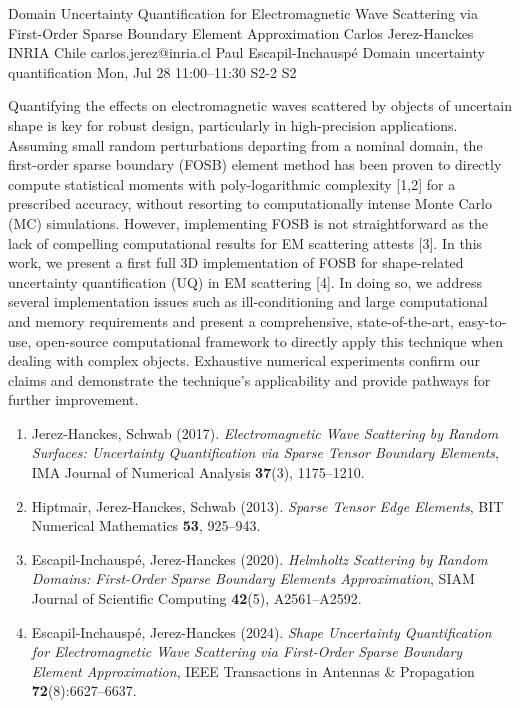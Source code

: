 \documentclass[12pt,lettersize,oneside]{book} %
\begin{document}
\begin{talk}
  {Domain Uncertainty Quantification for Electromagnetic Wave Scattering via First-Order Sparse Boundary Element Approximation}%
  {Carlos Jerez-Hanckes}%
  {INRIA Chile}%
  {carlos.jerez@inria.cl}%
  {Paul Escapil-Inchausp\'e}%
  {Domain uncertainty quantification}%
  {Mon, Jul 28 11:00--11:30}%
  {S2-2}%
  {S2}%
    
   
Quantifying the effects on electromagnetic waves scattered by objects of uncertain shape is key for robust design, particularly in high-precision applications. Assuming small random perturbations departing from a nominal domain, the first-order sparse boundary (FOSB) element method has been proven to directly compute statistical moments with poly-logarithmic complexity [1,2] for a prescribed accuracy, without resorting to computationally intense Monte Carlo (MC) simulations. However, implementing FOSB is not straightforward as the lack of compelling computational results for EM scattering attests [3]. In this work, we present a first full 3D implementation of FOSB for shape-related uncertainty quantification (UQ) in EM scattering [4]. In doing so, we address several implementation issues such as ill-conditioning and large computational and memory requirements and present a comprehensive, state-of-the-art, easy-to-use, open-source computational framework to directly apply this technique when dealing with complex objects. Exhaustive numerical experiments confirm our claims and demonstrate the technique's applicability and provide pathways for further improvement.

\medskip

\begin{enumerate}
 \item[{[1]}] Jerez-Hanckes, Schwab (2017). {\it Electromagnetic Wave Scattering by Random Surfaces: Uncertainty Quantification via Sparse Tensor Boundary Elements}, IMA Journal of Numerical Analysis {\bf 37}(3), 1175--1210.
 \item[{[2]}] Hiptmair, Jerez-Hanckes, Schwab (2013). {\it Sparse Tensor Edge Elements}, BIT Numerical Mathematics {\bf 53}, 925--943.
 \item[{[3]}] Escapil-Inchausp\'e, Jerez-Hanckes (2020). {\it Helmholtz Scattering by Random Domains: First-Order Sparse Boundary Elements Approximation}, SIAM Journal of Scientific Computing {\bf 42}(5), A2561--A2592.
 \item[{[4]}] Escapil-Inchausp\'e, Jerez-Hanckes (2024). {\it Shape Uncertainty Quantification for Electromagnetic Wave Scattering via First-Order Sparse Boundary Element Approximation}, IEEE Transactions in Antennas \& Propagation {\bf 72}(8):6627--6637.
\end{enumerate}


\end{talk}
\end{document}

